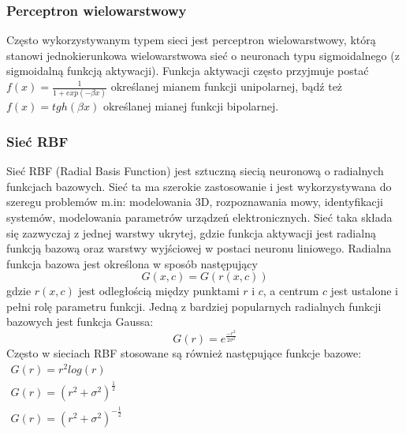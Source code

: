 \subsubsection*{Perceptron wielowarstwowy}
Często wykorzystywanym typem sieci jest perceptron wielowarstwowy, którą stanowi jednokierunkowa wielowarstwowa sieć o neuronach typu sigmoidalnego (z sigmoidalną funkcją aktywacji)\cite{Osowski}. Funkcja aktywacji często przyjmuje postać $f(x) = \frac{1}{1 + exp(-\beta x)}$ określanej mianem funkcji unipolarnej, bądź też $f(x) = tgh(\beta x)$ określanej mianej funkcji bipolarnej.
 
\subsubsection*{Sieć RBF}
Sieć RBF (Radial Basis Function) jest sztuczną siecią neuronową o radialnych funkcjach bazowych. Sieć ta ma szerokie zastosowanie i jest wykorzystywana do szeregu problemów m.in: modelowania 3D, rozpoznawania mowy, identyfikacji systemów, modelowania parametrów urządzeń elektronicznych\cite{Bors}. Sieć taka składa się zazwyczaj z jednej warstwy ukrytej, gdzie funkcja aktywacji jest radialną funkcją bazową oraz warstwy wyjściowej w postaci neuronu liniowego. Radialna funkcja bazowa jest określona w sposób następujący\cite{Bartkowiak}
\begin{equation}
	G(x,c) = G(r(x,c))
\end{equation}
gdzie $r(x,c)$ jest odległością między punktami $r$ i $c$, a centrum $c$ jest ustalone i pełni rolę parametru funkcji. Jedną z bardziej popularnych radialnych funkcji bazowych jest funkcja Gaussa:
\begin{equation}
	G(r) = e^{\frac{-r^2}{2\sigma^2}}
\end{equation}
Często w sieciach RBF stosowane są również następujące funkcje bazowe\cite{Chen}: \\
$\begin{array}{l}
 G(r) = r^2 log(r)\\
 G(r) = (r^2 + \sigma^2)^{\frac{1}{2}} \\
 G(r) = (r^2 + \sigma^2)^{-\frac{1}{2}}
\end{array}
$
